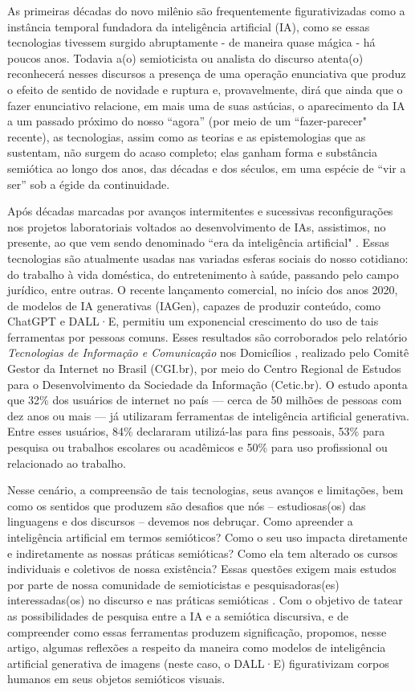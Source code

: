 \documentclass[portuguese]{textolivre}
\begin{document}
As primeiras décadas do novo milênio são frequentemente figurativizadas como a instância temporal fundadora da inteligência artificial (IA), como se essas tecnologias tivessem surgido abruptamente - de maneira quase mágica - há poucos anos. Todavia a(o) semioticista ou analista do discurso atenta(o) reconhecerá nesses discursos a presença de uma operação enunciativa que produz o efeito de sentido de novidade e ruptura e, provavelmente, dirá que ainda que o fazer enunciativo relacione, em mais uma de suas astúcias, o aparecimento da IA a um passado próximo do nosso “agora” (por meio de um “fazer-parecer" recente), as tecnologias, assim como as teorias e as epistemologias que as sustentam, não surgem do acaso completo; elas ganham forma e substância semiótica ao longo dos anos, das décadas e dos séculos, em uma espécie de “vir a ser” sob a égide da continuidade.

Após décadas marcadas por avanços intermitentes e sucessivas reconfigurações nos projetos laboratoriais voltados ao desenvolvimento de IAs, assistimos, no presente, ao que vem sendo denominado “era da inteligência artificial" \cite{schmidt2023era}. Essas tecnologias são atualmente usadas nas variadas esferas sociais do nosso cotidiano: do trabalho à vida doméstica, do entretenimento à saúde, passando pelo campo jurídico, entre outras. O recente lançamento comercial, no início dos anos 2020, de modelos de IA generativas (IAGen), capazes de produzir conteúdo, como ChatGPT e DALL·E, permitiu um exponencial crescimento do uso de tais ferramentas por pessoas comuns. Esses resultados são corroborados pelo relatório \textit{Tecnologias de Informação e Comunicação} nos Domicílios \cite{cgi2025tic}, realizado pelo Comitê Gestor da Internet no Brasil (CGI.br), por meio do Centro Regional de Estudos para o Desenvolvimento da Sociedade da Informação (Cetic.br). O estudo aponta que 32\% dos usuários de internet no país — cerca de 50 milhões de pessoas com dez anos ou mais — já utilizaram ferramentas de inteligência artificial generativa. Entre esses usuários, 84\% declararam utilizá-las para fins pessoais, 53\% para pesquisa ou trabalhos escolares ou acadêmicos e 50\% para uso profissional ou relacionado ao trabalho.

Nesse cenário, a compreensão de tais tecnologias, seus avanços e limitações, bem como os sentidos que produzem são desafios que nós – estudiosas(os) das linguagens e dos discursos – devemos nos debruçar. Como apreender a inteligência artificial em termos semióticos? Como o seu uso impacta diretamente e indiretamente as nossas práticas semióticas? Como ela tem alterado os cursos individuais e coletivos de nossa existência? Essas questões exigem mais estudos por parte de nossa comunidade de semioticistas e pesquisadoras(es) interessadas(os) no discurso e nas práticas semióticas \cite{fontanille2008pratiques}. Com o objetivo de tatear as possibilidades de pesquisa entre a IA e a semiótica discursiva, e de compreender como essas ferramentas produzem significação, propomos, nesse artigo, algumas reflexões a respeito da maneira como modelos de inteligência artificial generativa de imagens (neste caso, o DALL·E) figurativizam corpos humanos em seus objetos semióticos visuais.  
\end{document}
